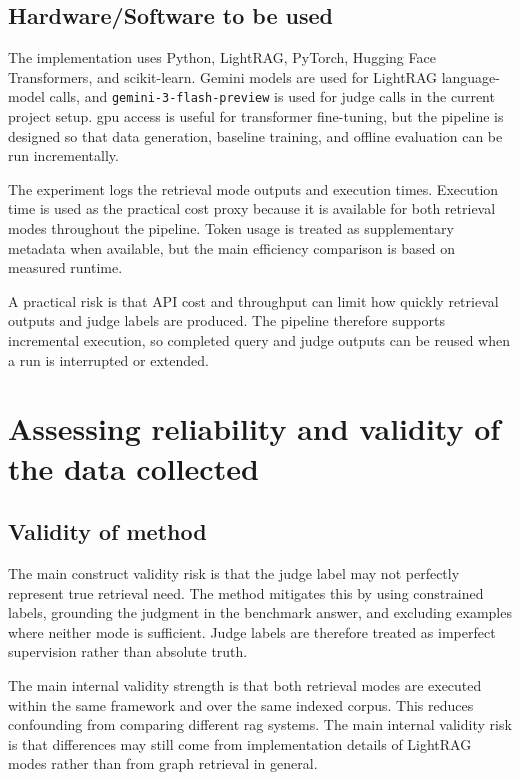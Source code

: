 \documentclass[english, bibtex]{kththesis}               %
\numberwithin{listing}{chapter}
\begin{document}
\subsection{Hardware/Software to be used}
\label{sec:hardwareSoftware}

The implementation uses Python, LightRAG, PyTorch, Hugging Face Transformers, and scikit-learn. Gemini models are used for LightRAG language-model calls, and \texttt{gemini-3-flash-preview} is used for judge calls in the current project setup. \Gls{gpu} access is useful for transformer fine-tuning, but the pipeline is designed so that data generation, baseline training, and offline evaluation can be run incrementally.

The experiment logs the retrieval mode outputs and execution times. Execution time is used as the practical cost proxy because it is available for both retrieval modes throughout the pipeline. Token usage is treated as supplementary metadata when available, but the main efficiency comparison is based on measured runtime.

A practical risk is that \gls{API} cost and throughput can limit how quickly retrieval outputs and judge labels are produced. The pipeline therefore supports incremental execution, so completed query and judge outputs can be reused when a run is interrupted or extended.

\section{Assessing reliability and validity of the data collected}
\label{sec:assessingReliability}

\subsection{Validity of method}
\label{sec:validtyOfMethod}

The main construct validity risk is that the judge label may not perfectly represent true retrieval need. The method mitigates this by using constrained labels, grounding the judgment in the benchmark answer, and excluding examples where neither mode is sufficient. Judge labels are therefore treated as imperfect supervision rather than absolute truth.

The main internal validity strength is that both retrieval modes are executed within the same framework and over the same indexed corpus. This reduces confounding from comparing different \gls{rag} systems. The main internal validity risk is that differences may still come from implementation details of LightRAG modes rather than from graph retrieval in general.
\end{document}
